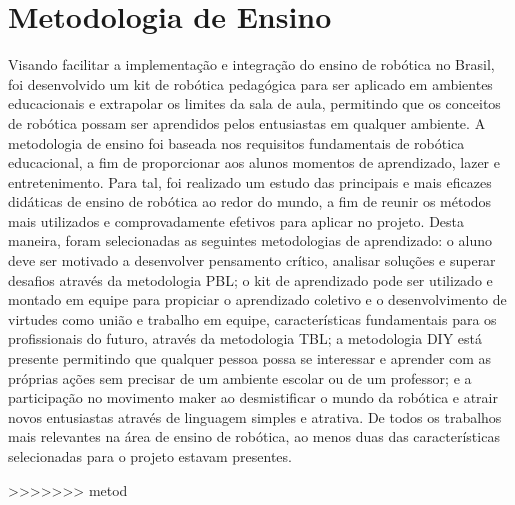 \section{Metodologia de Ensino}\label{sec:metod_ensino}
Visando facilitar a implementação e integração do ensino de robótica no Brasil, foi desenvolvido um kit de robótica pedagógica para ser aplicado em ambientes educacionais e extrapolar os limites da sala de aula, permitindo que os conceitos de robótica possam ser aprendidos pelos entusiastas em qualquer ambiente. A metodologia de ensino foi baseada nos requisitos fundamentais de robótica educacional, a fim de proporcionar aos alunos momentos de aprendizado, lazer e entretenimento. Para tal, foi realizado um estudo das principais e mais eficazes didáticas de ensino de robótica ao redor do mundo, a fim de reunir os métodos mais utilizados e comprovadamente efetivos para aplicar no projeto. Desta maneira, foram selecionadas as seguintes metodologias de aprendizado: o aluno deve ser motivado a desenvolver pensamento crítico, analisar soluções e superar desafios através da metodologia PBL; o kit de aprendizado pode ser utilizado e montado em equipe para propiciar o aprendizado coletivo e o desenvolvimento de virtudes como união e trabalho em equipe, características fundamentais para os profissionais do futuro, através da metodologia TBL; a metodologia DIY está presente permitindo que qualquer pessoa possa se interessar e aprender com as próprias ações sem precisar de um ambiente escolar ou de um professor; e a participação no movimento maker ao desmistificar o mundo da robótica e atrair novos entusiastas através de linguagem simples e atrativa. De todos os trabalhos mais relevantes na área de ensino de robótica, ao menos duas das características selecionadas para o projeto estavam presentes.
	
>>>>>>> metod
